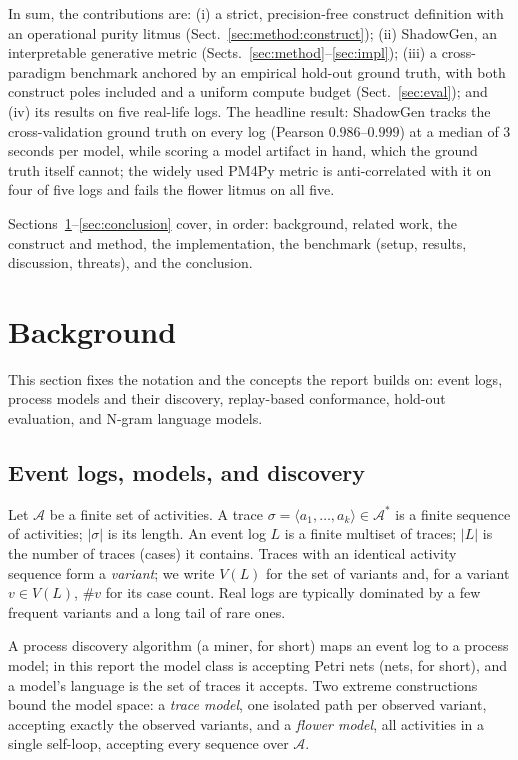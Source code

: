 \documentclass[runningheads]{llncs}
\begin{document}
In sum, the contributions are: (i) a strict, precision-free construct definition with an operational purity litmus (Sect.~\ref{sec:method:construct}); (ii) ShadowGen, an interpretable generative metric (Sects.~\ref{sec:method}--\ref{sec:impl}); (iii) a cross-paradigm benchmark anchored by an empirical hold-out ground truth, with both construct poles included and a uniform compute budget (Sect.~\ref{sec:eval}); and (iv) its results on five real-life logs. The headline result: ShadowGen tracks the cross-validation ground truth on every log (Pearson $0.986$--$0.999$) at a median of $3$ seconds per model, while scoring a model artifact in hand, which the ground truth itself cannot; the widely used PM4Py metric is anti-correlated with it on four of five logs and fails the flower litmus on all five.

Sections~\ref{sec:background}--\ref{sec:conclusion} cover, in order: background, related work, the construct and method, the implementation, the benchmark (setup, results, discussion, threats), and the conclusion.

\section{Background}
\label{sec:background}
This section fixes the notation and the concepts the report builds on: event logs, process models and their discovery, replay-based conformance, hold-out evaluation, and N-gram language models.

\subsection{Event logs, models, and discovery}
Let $\mathcal{A}$ be a finite set of activities. A trace $\sigma=\langle a_1,\dots,a_k\rangle\in\mathcal{A}^{*}$ is a finite sequence of activities; $|\sigma|$ is its length. An event log $L$ is a finite multiset of traces; $|L|$ is the number of traces (cases) it contains. Traces with an identical activity sequence form a \emph{variant}; we write $V(L)$ for the set of variants and, for a variant $v\in V(L)$, $\#v$ for its case count. Real logs are typically dominated by a few frequent variants and a long tail of rare ones.

A process discovery algorithm (a miner, for short) maps an event log to a process model; in this report the model class is accepting Petri nets (nets, for short), and a model's language is the set of traces it accepts. Two extreme constructions bound the model space: a \emph{trace model}, one isolated path per observed variant, accepting exactly the observed variants, and a \emph{flower model}, all activities in a single self-loop, accepting every sequence over $\mathcal{A}$.
\end{document}
